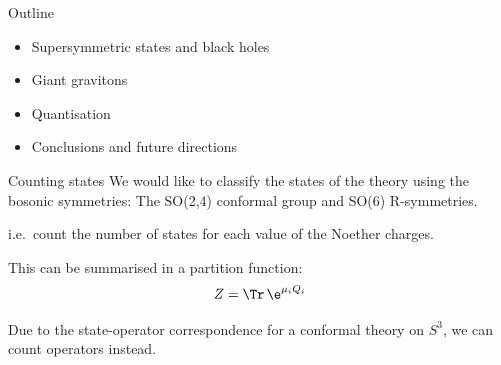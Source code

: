 \documentclass[%
ps,accumulate,
colorBG, slideColor,
total,
serpaggi
%
]{prosper}
\begin{document}

\begin{slide}{Outline}
%
 \begin{itemize}
    \item Supersymmetric states and black holes
    \item Giant gravitons
    \item Quantisation
    \item Conclusions and future directions
 \end{itemize}
%
\end{slide}
%


\begin{slide}{Counting states}
%
 We would like to classify the states of the theory using the
 bosonic symmetries: The SO(2,4) conformal group and SO(6) R-symmetries.

 \vp i.e.\ count the number of states for each value of the Noether
 charges.

 \vp This can be summarised in a partition function:
 \begin{equation*}
    Z = \Tr\,\e^{\mu_i Q_i}
 \end{equation*}

 Due to the state-operator correspondence for a conformal theory on
 $S^3$, we can count operators instead.

%
\end{slide}
\end{document}
